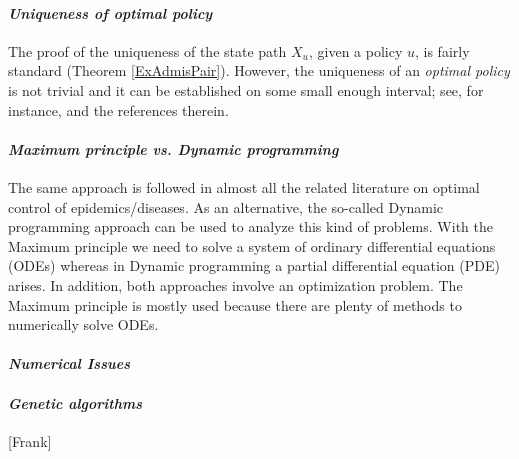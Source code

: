 \paragraph{\it Uniqueness of optimal policy}
The proof of the uniqueness of the state path $X_u$, given a policy $u$, is
fairly standard (Theorem \ref{ExAdmisPair}). However, the uniqueness of an 
{\it optimal policy} is not trivial and it can be established on some small 
enough interval; see, for instance, \cite{GaffSchaefer09} and the references 
therein.  
\medskip

\paragraph{\it Maximum principle vs. Dynamic programming} 
  The same approach is followed in almost all the related literature on optimal
control of epidemics/diseases. As an alternative, the so-called Dynamic
programming approach can be used to analyze this kind of problems. With the
Maximum principle we need to solve a system of ordinary differential equations
(ODEs) whereas in Dynamic programming a partial differential equation (PDE)
arises. In addition, both approaches involve an optimization problem. The
Maximum principle is mostly used because there are plenty of methods to
numerically solve ODEs.
\medskip
\paragraph{\it Numerical Issues}

\medskip
\paragraph{\it Genetic algorithms}[Frank]
